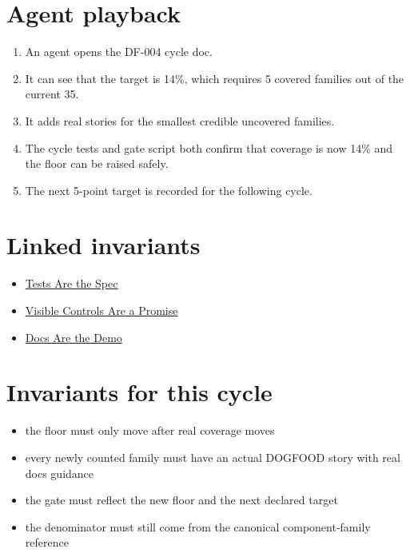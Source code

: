 \section{Agent playback}\label{record-066-agent-playback}

\begin{enumerate}
\def\labelenumi{\arabic{enumi}.}
\tightlist
\item
  An agent opens the DF-004 cycle doc.
\item
  It can see that the target is 14\%, which requires 5 covered families out of the current 35.
\item
  It adds real stories for the smallest credible uncovered families.
\item
  The cycle tests and gate script both confirm that coverage is now 14\% and the floor can be raised safely.
\item
  The next 5-point target is recorded for the following cycle.
\end{enumerate}

\section{Linked invariants}\label{record-066-linked-invariants}

\begin{itemize}
\tightlist
\item
  \href{https://github.com/flyingrobots/bijou/blob/cbd70612140e7a450d764b3c7be1c6af878b99bc/docs/invariants/tests-are-the-spec.md}{Tests Are the Spec}
\item
  \href{https://github.com/flyingrobots/bijou/blob/cbd70612140e7a450d764b3c7be1c6af878b99bc/docs/invariants/visible-controls-are-a-promise.md}{Visible Controls Are a Promise}
\item
  \href{https://github.com/flyingrobots/bijou/blob/cbd70612140e7a450d764b3c7be1c6af878b99bc/docs/invariants/docs-are-the-demo.md}{Docs Are the Demo}
\end{itemize}

\section{Invariants for this cycle}\label{record-066-invariants-for-this-cycle}

\begin{itemize}
\tightlist
\item
  the floor must only move after real coverage moves
\item
  every newly counted family must have an actual DOGFOOD story with real docs guidance
\item
  the gate must reflect the new floor and the next declared target
\item
  the denominator must still come from the canonical component-family reference
\end{itemize}

